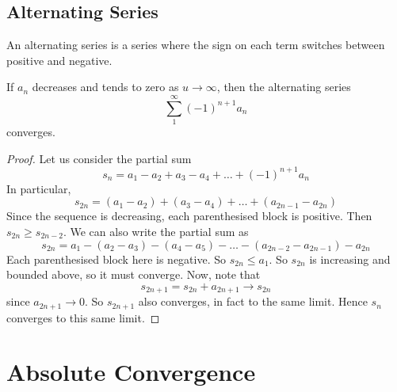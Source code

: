 \documentclass{article}
\begin{document}
\subsection{Alternating Series}
An alternating series is a series where the sign on each term switches between positive and negative.
\begin{theorem}
	If $a_n$ decreases and tends to zero as $u \to \infty$, then the alternating series
	\[ \sum_1^\infty (-1)^{n+1} a_n \]
	converges.
\end{theorem}
\begin{proof}
	Let us consider the partial sum
	\[ s_n = a_1 - a_2 + a_3 - a_4 + \dots + (-1)^{n+1}a_n \]
	In particular,
	\[ s_{2n} = (a_1 - a_2) + (a_3 - a_4) + \dots + (a_{2n-1} - a_{2n}) \]
	Since the sequence is decreasing, each parenthesised block is positive. Then $s_{2n} \geq s_{2n-2}$. We can also write the partial sum as
	\[ s_{2n} = a_1 - (a_2 - a_3) - (a_4 - a_5) - \dots - (a_{2n-2} - a_{2n-1}) - a_{2n} \]
	Each parenthesised block here is negative. So $s_{2n} \leq a_1$. So $s_{2n}$ is increasing and bounded above, so it must converge. Now, note that
	\[ s_{2n+1} = s_{2n} + a_{2n+1} \to s_{2n} \]
	since $a_{2n+1} \to 0$. So $s_{2n+1}$ also converges, in fact to the same limit. Hence $s_n$ converges to this same limit.
\end{proof}

\section{Absolute Convergence}
\end{document}
